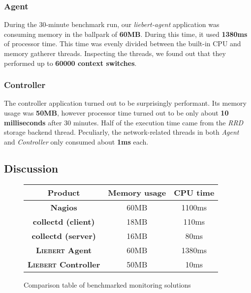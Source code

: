         \subsubsection{Agent}
            During the 30-minute benchmark run, our \textit{liebert-agent} application was consuming memory in the ballpark of \textbf{60MB}. During this time, it used \textbf{1380ms} of processor time. This time was evenly divided between the built-in CPU and memory gatherer threads. Inspecting the threads, we found out that they performed up to \textbf{60000 context switches}.
            
        \subsubsection{Controller}
            The controller application turned out to be surprisingly performant. Its memory usage was \textbf{50MB}, however processor time turned out to be only about \textbf{10 milliseconds} after 30 minutes. Half of the execution time came from the \textit{RRD} storage backend thread. Peculiarly, the network-related threads in both \textit{Agent} and \textit{Controller} only consumed about \textbf{1ms} each.
            
            
    \subsection{Discussion}
        \begin{figure}
            \centering
            \begin{tabular}{ |c|c|c| }
                \hline
                    Product & Memory usage & CPU time\\
                    \hline
                    \textbf{Nagios} & 60MB & 1100ms\\
                    \hline
                    \textbf{collectd (client)} & 18MB & 110ms\\
                    \hline
                    \textbf{collectd (server)} & 16MB & 80ms\\
                    \hline
                    \textbf{\textsc{Liebert} Agent} & 60MB & 1380ms\\
                    \hline
                    \textbf{\textsc{Liebert} Controller} & 50MB & 10ms\\
                \hline
            \end{tabular}
            \caption{Comparison table of benchmarked monitoring solutions}\label{fig:comparison-table-results}
        \end{figure}
        
